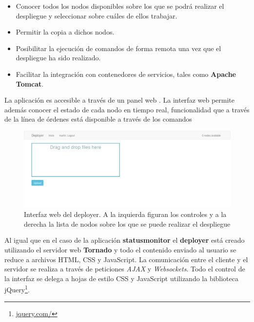 \begin{itemize}
\item Conocer todos los nodos disponibles sobre los que se podrá realizar el despliegue y seleccionar sobre cuáles de ellos trabajar.
\item Permitir la copia a dichos nodos.
\item Posibilitar la ejecución de comandos de forma remota una vez que el despliegue ha sido realizado.
\item Facilitar la integración con contenedores de servicios, tales como \textbf{Apache Tomcat}.
\end{itemize}

La aplicación es accesible a través de un panel web %
. La interfaz web permite además conocer el estado de cada nodo en tiempo real, funcionalidad que a través de la línea de órdenes está disponible a través de los comandos %

\begin{figure}[H]
\centering
\includegraphics[width=\textwidth]{Chapter4/Figures/deployer}
\caption[Interfaz web del deployer]{Interfaz web del deployer. A la izquierda figuran los controles y a la derecha la lista de nodos sobre los que se puede realizar el despliegue}
\label{fig:vista_deployer}
\end{figure}

Al igual que en el caso de la aplicación \textbf{statusmonitor} el \textbf{deployer} está creado utilizando el servidor web \textbf{Tornado} y todo el contenido enviado al usuario se reduce a archivos HTML, CSS y JavaScript. La comunicación entre el cliente y el servidor se realiza a través de peticiones \textit{AJAX} y \textit{Websockets}. Todo el control de la interfaz se delega a hojas de estilo CSS y JavaScript utilizando la biblioteca jQuery\footnote{\href{https://jquery.com/}{jquery.com/}}.

